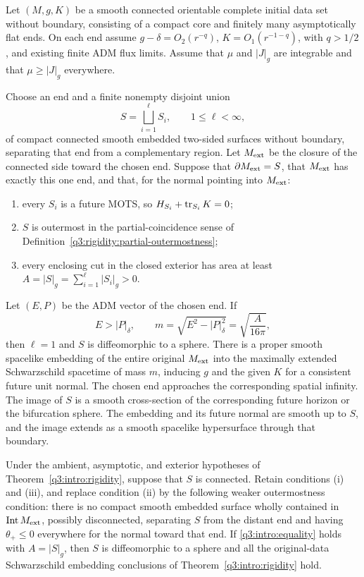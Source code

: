 \begin{theorem}
\label{q3:intro:rigidity}
Let $(M,g,K)$ be a smooth connected orientable complete initial data
set without boundary, consisting of a compact core and finitely many
asymptotically flat ends. On each end assume
$g-\delta=O_2(r^{-q})$, $K=O_1(r^{-1-q})$, with $q>1/2$, and existing
finite ADM flux limits. Assume that $\mu$ and $|J|_g$ are integrable
and that $\mu\geq|J|_g$ everywhere.

Choose an end and a finite nonempty disjoint union
\[
S=\bigsqcup_{i=1}^{\ell}S_i,\qquad 1\leq\ell<\infty,
\]
of compact connected smooth embedded two-sided surfaces without boundary,
separating
that end from a complementary region. Let $M_{\mathrm{ext}}$ be the closure of
the connected side toward the chosen end. Suppose that
$\partial M_{\mathrm{ext}}=S$, that $M_{\mathrm{ext}}$ has exactly this one end, and that,
for the normal pointing into $M_{\mathrm{ext}}$:
\begin{enumerate}[label=\textup{(\roman*)}]
\item every $S_i$ is a future MOTS, so $H_{S_i}+\operatorname{tr}_{S_i}K=0$;
\item $S$ is outermost in the partial-coincidence sense of
Definition~\ref{q3:rigidity:partial-outermostness};
\item every enclosing cut in the closed exterior has area at least
$A=|S|_g=\sum_{i=1}^{\ell}|S_i|_g>0$.
\end{enumerate}
Let $(E,P)$ be the ADM vector of the chosen end. If
\begin{equation}
\label{q3:intro:equality}
E>|P|_\delta,\qquad
m=\sqrt{E^2-|P|_\delta^2}=\sqrt{\frac{A}{16\pi}},
\end{equation}
then $\ell=1$ and $S$ is diffeomorphic to a sphere. There is a proper
smooth spacelike embedding of the entire original $M_{\mathrm{ext}}$ into the
maximally extended Schwarzschild spacetime of mass $m$, inducing $g$
and the given $K$ for a consistent future unit normal. The chosen end
approaches the corresponding spatial infinity. The image of $S$ is a
smooth cross-section of the corresponding future horizon or the
bifurcation sphere. The embedding and its future normal are smooth
up to $S$, and the image extends as a smooth spacelike hypersurface
through that boundary.
\end{theorem}

\begin{theorem}
\label{q3:intro:connected-rigidity}
Under the ambient, asymptotic, and exterior hypotheses of
Theorem~\ref{q3:intro:rigidity}, suppose that $S$ is connected.
Retain conditions \textup{(i)} and \textup{(iii)}, and replace
condition \textup{(ii)} by the following weaker outermostness condition:
there is no compact smooth embedded surface wholly contained in
$\operatorname{Int}M_{\mathrm{ext}}$, possibly disconnected, separating $S$
from the distant end and having $\theta_+\le0$ everywhere for the
normal toward that end. If \eqref{q3:intro:equality} holds with
$A=|S|_g$, then $S$ is diffeomorphic to a sphere and all the
original-data Schwarzschild embedding conclusions of
Theorem~\ref{q3:intro:rigidity} hold.
\end{theorem}

